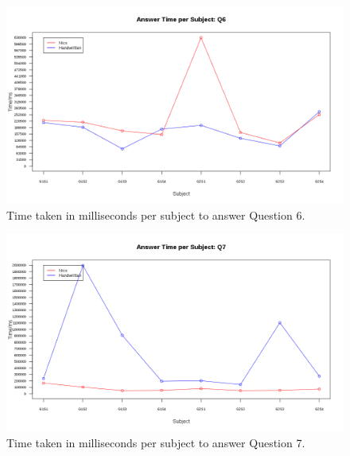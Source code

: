\documentclass[12pt,twoside,notitlepage,xetex]{report}
\begin{document}
\begin{center}
\begin{figure}[H]
\begin{center}
\includegraphics[width=\textwidth-2cm]{figs/graphs/q6.png}
\end{center}
\caption{Time taken in milliseconds per subject to answer Question 6.}
\end{figure}
\end{center}

\begin{center}
\begin{figure}[H]
\begin{center}
\includegraphics[width=\textwidth-2cm]{figs/graphs/q7.png}
\end{center}
\caption{Time taken in milliseconds per subject to answer Question 7.}
\end{figure}
\end{center}
\end{document}
